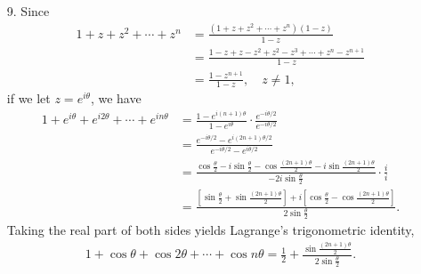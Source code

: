 \documentclass[a4paper,12pt]{article}
\begin{document}
\begin{enumerate}
    \item[9.]
        Since
        \begin{align*}
            1 + z + z^2 + \cdots + z^n &= \frac{(1 + z + z^2 + \cdots + z^n)(1 - z)}{1 - z} \\
            &= \frac{1 - z + z - z^2 + z^2 - z^3 + \cdots + z^n - z^{n + 1}}{1 - z} \\
            &= \frac{1 - z^{n + 1}}{1 - z}, \quad z \neq 1,
        \end{align*}
        if we let $z = e^{i\theta}$, we have
        \begin{align*}
            1 + e^{i\theta} + e^{i2\theta} + \cdots + e^{in\theta} &= \frac{1 - e^{i(n + 1)\theta}}{1 - e^{i\theta}} \cdot \frac{e^{-i\theta/2}}{e^{-i\theta/2}} \\
            &= \frac{e^{-i\theta/2} - e^{i(2n + 1)\theta/2}}{e^{-i\theta/2} - e^{i\theta/2}} \\
            &= \frac{\cos\frac{\theta}{2} - i\sin\frac{\theta}{2} - \cos\frac{(2n + 1)\theta}{2} - i\sin\frac{(2n + 1)\theta}{2}}{-2i\sin\frac{\theta}{2}} \cdot \frac{i}{i} \\
            &= \frac{\left[ \sin\frac{\theta}{2} + \sin\frac{(2n + 1)\theta}{2} \right] + i \left[ \cos\frac{\theta}{2} - \cos\frac{(2n + 1)\theta}{2} \right]}{2 \sin\frac{\theta}{2}}.
        \end{align*}
        Taking the real part of both sides yields Lagrange's trigonometric identity,
        \begin{align*}
            1 + \cos\theta + \cos2\theta + \cdots + \cos n\theta = \frac{1}{2} + \frac{\sin\frac{(2n + 1)\theta}{2}}{2\sin\frac{\theta}{2}}.
        \end{align*}

\end{enumerate}
\end{document}

